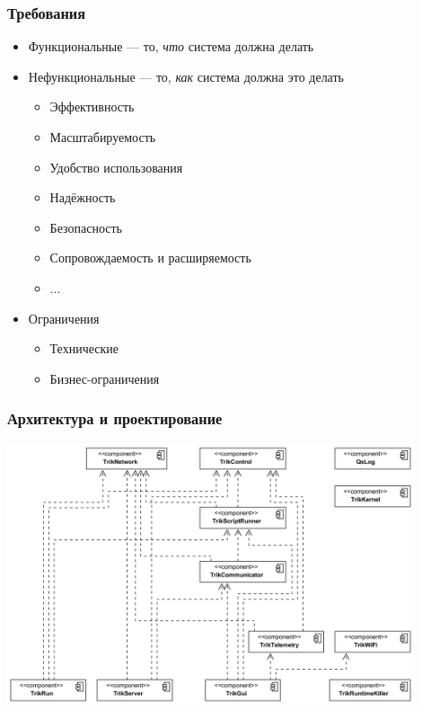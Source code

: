\documentclass[xetex,mathserif,serif]{beamer}
\begin{document}
    \begin{frame}
        \frametitle{Требования}
        \begin{itemize}
            \item Функциональные --- то, \emph{что} система должна делать
            \item Нефункциональные --- то, \emph{как} система должна это делать
            \begin{itemize}
                \item Эффективность
                \item Масштабируемость
                \item Удобство использования
                \item Надёжность
                \item Безопасность
                \item Сопровождаемость и расширяемость
                \item ...
            \end{itemize}
            \item Ограничения
            \begin{itemize}
                \item Технические
                \item Бизнес-ограничения
            \end{itemize}
        \end{itemize}
    \end{frame}

    \begin{frame}
        \frametitle{Архитектура и проектирование}
        \begin{center}
            \includegraphics[width=0.9\textwidth]{trikRuntimeComponents.png}
        \end{center}
    \end{frame}
\end{document}
